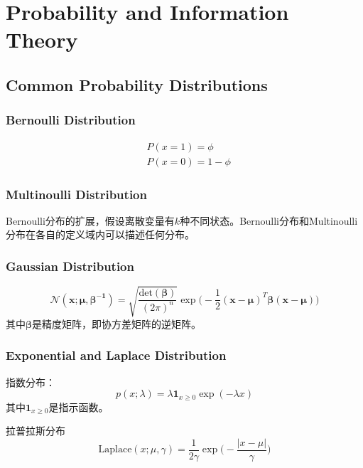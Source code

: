 \chapter{Probability and Information Theory}

\setcounter{section}{8}
\section{Common Probability Distributions}

\subsection{Bernoulli Distribution}
\begin{equation}\begin{split}
&P(x=1)=\phi\\
&P(x=0)=1-\phi
\end{split}\end{equation}

\subsection{Multinoulli Distribution}

Bernoulli分布的扩展，假设离散变量有$k$种不同状态。Bernoulli分布和Multinoulli分布在各自的定义域内可以描述任何分布。

\subsection{Gaussian Distribution}

\begin{equation}
\mathcal N(\mathbf x;\mathbf{\mu,\beta^{-1}})=\sqrt{\frac{\text{det}(\mathbf\beta)}{(2\pi)^n}}\exp\Big(-\frac{1}{2}(\mathbf{x-\mu})^T\mathbf\beta(\mathbf{x-\mu})\Big)
\end{equation}
其中$\mathbf\beta$是精度矩阵，即协方差矩阵的逆矩阵。

\subsection{Exponential and Laplace Distribution}

指数分布：
\begin{equation}
p(x;\lambda)=\lambda\mathbf{1}_{x\ge 0}\exp(-\lambda x)
\end{equation}
其中$\mathbf{1}_{x\ge 0}$是指示函数。

拉普拉斯分布
\begin{equation}
\text{Laplace}(x;\mu,\gamma)=\frac{1}{2\gamma}\exp\Big(-\frac{|x-\mu|}{\gamma}\Big)
\end{equation}

